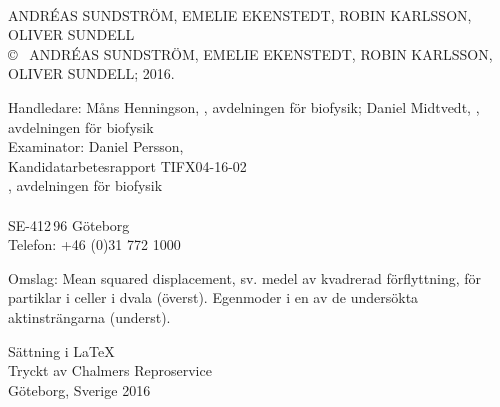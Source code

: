 
\clearpage
{}
\setcounter{page}{2}%
\thispagestyle{plain}

\begin{flushleft}


\vspace*{2cm}
\titel\\
\undertitel

ANDRÉAS SUNDSTRÖM, EMELIE EKENSTEDT, ROBIN KARLSSON, OLIVER SUNDELL \\[1cm]

\copyright ~ ANDRÉAS SUNDSTRÖM, EMELIE EKENSTEDT, ROBIN KARLSSON, OLIVER SUNDELL; 2016. 
\setlength{\parskip}{1cm}


Handledare: Måns Henningson, \institution, avdelningen för biofysik;  Daniel Midtvedt, \institution, avdelningen för biofysik\\
Examinator: Daniel Persson, \institution
\\[1cm]

Kandidatarbetesrapport TIFX04-16-02\\	%
\institution, avdelningen för biofysik\\
\skola\\
SE-412\,96 Göteborg\\
Telefon: +46 (0)31 772 1000 
\setlength{\parskip}{0.5cm}

\vfill
Omslag: Mean squared displacement, sv. medel av kvadrerad förflyttning, för partiklar i celler i dvala (överst). Egenmoder i en av de undersökta aktinsträngarna (underst).
\setlength{\parskip}{1cm}

Sättning i \LaTeX \\
Tryckt av Chalmers Reproservice\\
Göteborg, Sverige 2016
\hfill

\setcounter{footnote}{0} 

\end{flushleft}

\renewcommand{\thefootnote}{\arabic{footnote}}
\setcounter{footnote}{0} 


